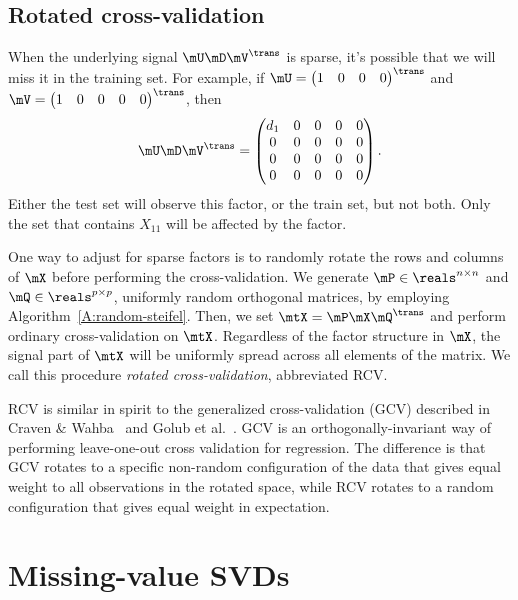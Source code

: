 \subsection{Rotated cross-validation}

When the underlying signal $\mU \mD \mV^\trans$ is sparse, it's possible that we will miss it in the training set.  For example, if 
\(
    \mU 
    =
    \left(
    \begin{matrix}
        1 & 0 & 0 & 0
    \end{matrix}
    \right)^\trans
\)
and
\(
    \mV
    =
    \left(
    \begin{matrix}
        1 & 0 & 0 & 0 & 0
    \end{matrix}
    \right)^\trans
\),
then
\[
    \mU \mD \mV^\trans
    =
    \left(
    \begin{matrix}
        d_{1} & 0 & 0 & 0 & 0 \\
        0     & 0 & 0 & 0 & 0 \\
        0     & 0 & 0 & 0 & 0 \\
        0     & 0 & 0 & 0 & 0 
    \end{matrix}
    \right).
\]
Either the test set will observe this factor, or the train set, but not both.  Only the set that contains $X_{11}$ will be affected by the factor.

One way to adjust for sparse factors is to randomly rotate the rows and
columns of $\mX$ before performing the cross-validation. We generate $\mP \in
\reals^{n \times n}$ and $\mQ \in \reals^{p \times p}$, uniformly random
orthogonal matrices, by employing Algorithm~\ref{A:random-steifel}. Then, we
set $\mtX = \mP \mX \mQ^\trans$ and perform ordinary cross-validation on
$\mtX$. Regardless of the factor structure in $\mX$, the signal part of $\mtX$
will be uniformly spread across all elements of the matrix. We call this
procedure \emph{rotated cross-validation}, abbreviated RCV.  

RCV is similar in spirit to the generalized cross-validation (GCV) described
in Craven \& Wahba~\cite{craven1978smoothing} and Golub et
al.~\cite{golub1979generalized}. GCV is an orthogonally-invariant way of
performing leave-one-out cross validation for regression. The difference is
that GCV rotates to a specific non-random configuration of the data that gives
equal weight to all observations in the rotated space, while RCV rotates to a 
random configuration that gives equal weight in expectation.


\section{Missing-value SVDs}\label{S:missing-values-svds}

